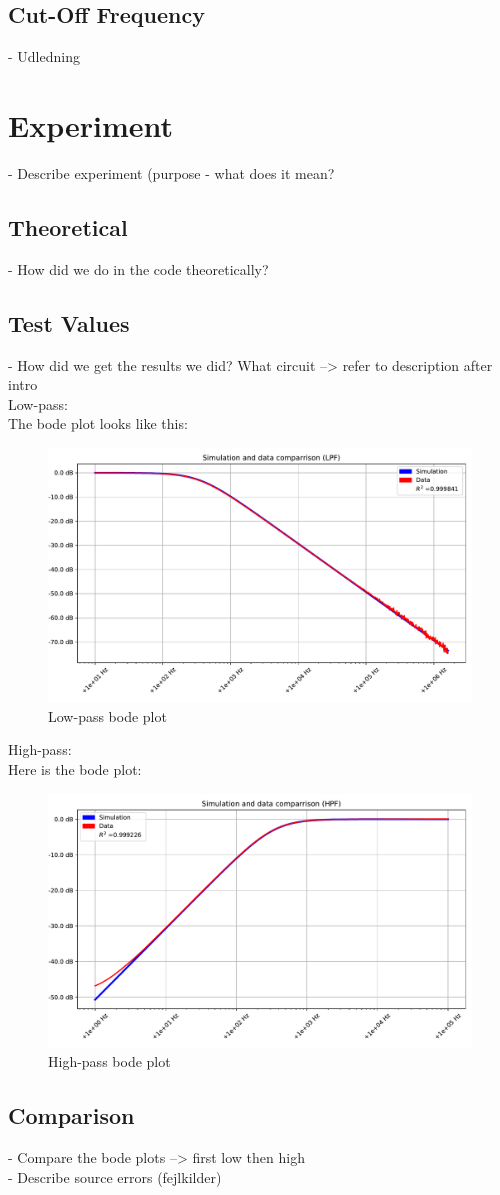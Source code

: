 \subsection{Cut-Off Frequency}
- Udledning
\section{Experiment}
- Describe experiment (purpose - what does it mean?
\subsection{Theoretical}
- How did we do in the code theoretically?
\subsection{Test Values}
- How did we get the results we did? What circuit --> refer to description after intro \\
Low-pass: \\
The bode plot looks like this:
\begin{figure}[H]
\center
	\includegraphics[scale=0.5]{fig/img/bode_LPF_plot.pdf}
	\caption{Low-pass bode plot}
	\label{lp:bode}
\end{figure}
High-pass: \\
Here is the bode plot:
\begin{figure}[H]
\center
	\includegraphics[scale=0.5]{fig/img/bode_HPF_plot.pdf}
	\caption{High-pass bode plot}
	\label{hp:bode}
\end{figure}
\subsection{Comparison}
- Compare the bode plots --> first low then high \\
- Describe source errors (fejlkilder) 